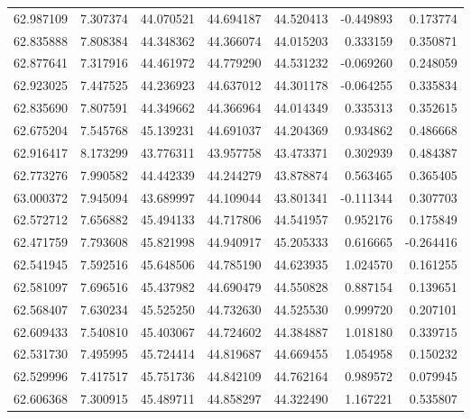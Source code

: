 \begin{tabular}{rrrrrrr}
 62.987109 &   7.307374 &         44.070521 &         44.694187 &         44.520413 & -0.449893 &  0.173774 \\
 62.835888 &   7.808384 &         44.348362 &         44.366074 &         44.015203 &  0.333159 &  0.350871 \\
 62.877641 &   7.317916 &         44.461972 &         44.779290 &         44.531232 & -0.069260 &  0.248059 \\
 62.923025 &   7.447525 &         44.236923 &         44.637012 &         44.301178 & -0.064255 &  0.335834 \\
 62.835690 &   7.807591 &         44.349662 &         44.366964 &         44.014349 &  0.335313 &  0.352615 \\
 62.675204 &   7.545768 &         45.139231 &         44.691037 &         44.204369 &  0.934862 &  0.486668 \\
 62.916417 &   8.173299 &         43.776311 &         43.957758 &         43.473371 &  0.302939 &  0.484387 \\
 62.773276 &   7.990582 &         44.442339 &         44.244279 &         43.878874 &  0.563465 &  0.365405 \\
 63.000372 &   7.945094 &         43.689997 &         44.109044 &         43.801341 & -0.111344 &  0.307703 \\
 62.572712 &   7.656882 &         45.494133 &         44.717806 &         44.541957 &  0.952176 &  0.175849 \\
 62.471759 &   7.793608 &         45.821998 &         44.940917 &         45.205333 &  0.616665 & -0.264416 \\
 62.541945 &   7.592516 &         45.648506 &         44.785190 &         44.623935 &  1.024570 &  0.161255 \\
 62.581097 &   7.696516 &         45.437982 &         44.690479 &         44.550828 &  0.887154 &  0.139651 \\
 62.568407 &   7.630234 &         45.525250 &         44.732630 &         44.525530 &  0.999720 &  0.207101 \\
 62.609433 &   7.540810 &         45.403067 &         44.724602 &         44.384887 &  1.018180 &  0.339715 \\
 62.531730 &   7.495995 &         45.724414 &         44.819687 &         44.669455 &  1.054958 &  0.150232 \\
 62.529996 &   7.417517 &         45.751736 &         44.842109 &         44.762164 &  0.989572 &  0.079945 \\
 62.606368 &   7.300915 &         45.489711 &         44.858297 &         44.322490 &  1.167221 &  0.535807 \\

\end{tabular}
